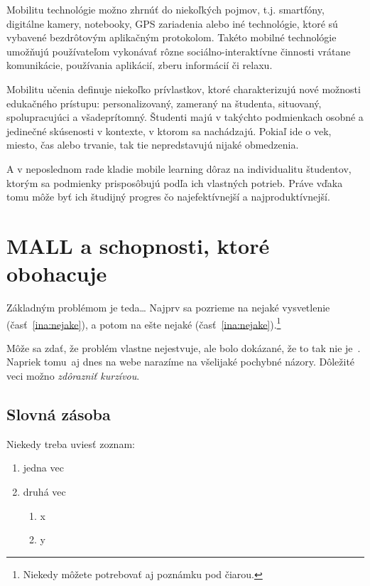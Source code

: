 \documentclass[10pt,twoside,slovak,a4paper]{article}
\begin{document}
Mobilitu technológie možno zhrnúť do niekoľkých pojmov, t.j. smartfóny, digitálne kamery, notebooky, GPS zariadenia alebo iné technológie, ktoré sú vybavené bezdrôtovým aplikačným protokolom. Takéto mobilné technológie umožňujú používateľom vykonávať rôzne sociálno-interaktívne činnosti vrátane komunikácie, používania aplikácií, zberu informácií či relaxu\cite{Kim2012}.

Mobilitu učenia definuje niekoľko prívlastkov, ktoré charakterizujú nové možnosti edukačného prístupu: personalizovaný, zameraný na študenta, situovaný, spolupracujúci a všadeprítomný. Študenti majú v takýchto podmienkach osobné a jedinečné skúsenosti v kontexte, v ktorom sa nachádzajú. Pokiaľ ide o vek, miesto, čas alebo trvanie, tak tie nepredstavujú nijaké obmedzenia\cite{Kim2012}. 

A v neposlednom rade kladie mobile learning dôraz na individualitu študentov, ktorým sa podmienky prisposôbujú podľa ich vlastných potrieb. Práve vďaka tomu môže byť ich študijný progres čo najefektívnejší a najproduktívnejší.



\section{MALL a schopnosti, ktoré obohacuje} \label{mall}

Základným problémom je teda\ldots{} Najprv sa pozrieme na nejaké vysvetlenie (časť~\ref{ina:nejake}), a potom na ešte nejaké (časť~\ref{ina:nejake}).\footnote{Niekedy môžete potrebovať aj poznámku pod čiarou.}

Môže sa zdať, že problém vlastne nejestvuje\cite{Miangah2012}, ale bolo dokázané, že to tak nie je~\cite{KukulskaHulme2009}. Napriek tomu\, aj dnes na webe narazíme na všelijaké pochybné názory\cite{Kim2012}. Dôležité veci\cite{Azar2014} možno \emph{zdôrazniť kurzívou}.


\subsection{Slovná zásoba} \label{mall:slovnazasoba}

Niekedy treba uviesť zoznam:

\begin{enumerate}
\item jedna vec
\item druhá vec
	\begin{enumerate}
	\item x
	\item y
	\end{enumerate}
\end{enumerate}
\end{document}
